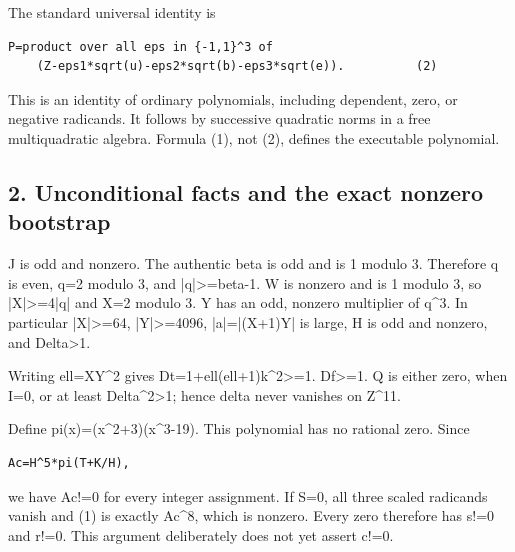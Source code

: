 The standard universal identity is



\begin{verbatim}
P=product over all eps in {-1,1}^3 of
    (Z-eps1*sqrt(u)-eps2*sqrt(b)-eps3*sqrt(e)).          (2)
\end{verbatim}

This is an identity of ordinary polynomials, including dependent, zero, or negative radicands. It follows by successive quadratic norms in a free multiquadratic algebra. Formula (1), not (2), defines the executable polynomial.



\subsection*{2. Unconditional facts and the exact nonzero bootstrap}



J is odd and nonzero. The authentic beta is odd and is 1 modulo 3. Therefore q is even, q=\allowbreak{}2 modulo 3, and |q|\textgreater{}\allowbreak{}=\allowbreak{}beta-1. W is nonzero and is 1 modulo 3, so |X|\textgreater{}\allowbreak{}=\allowbreak{}4|q| and X=\allowbreak{}2 modulo 3. Y has an odd, nonzero multiplier of q\textasciicircum{}\allowbreak{}3. In particular |X|\textgreater{}\allowbreak{}=\allowbreak{}64, |Y|\textgreater{}\allowbreak{}=\allowbreak{}4096, |a|=\allowbreak{}|(X+\allowbreak{}1)Y| is large, H is odd and nonzero, and Delta\textgreater{}\allowbreak{}1.



Writing ell=\allowbreak{}XY\textasciicircum{}\allowbreak{}2 gives Dt=\allowbreak{}1+\allowbreak{}ell(ell+\allowbreak{}1)k\textasciicircum{}\allowbreak{}2\textgreater{}\allowbreak{}=\allowbreak{}1. Df\textgreater{}\allowbreak{}=\allowbreak{}1. Q is either zero, when I=\allowbreak{}0, or at least Delta\textasciicircum{}\allowbreak{}2\textgreater{}\allowbreak{}1; hence delta never vanishes on Z\textasciicircum{}\allowbreak{}11.



Define pi(x)=\allowbreak{}(x\textasciicircum{}\allowbreak{}2+\allowbreak{}3)(x\textasciicircum{}\allowbreak{}3-19). This polynomial has no rational zero. Since



\begin{verbatim}
Ac=H^5*pi(T+K/H),
\end{verbatim}

we have Ac!=\allowbreak{}0 for every integer assignment. If S=\allowbreak{}0, all three scaled radicands vanish and (1) is exactly Ac\textasciicircum{}\allowbreak{}8, which is nonzero. Every zero therefore has s!=\allowbreak{}0 and r!=\allowbreak{}0. This argument deliberately does not yet assert c!=\allowbreak{}0.



